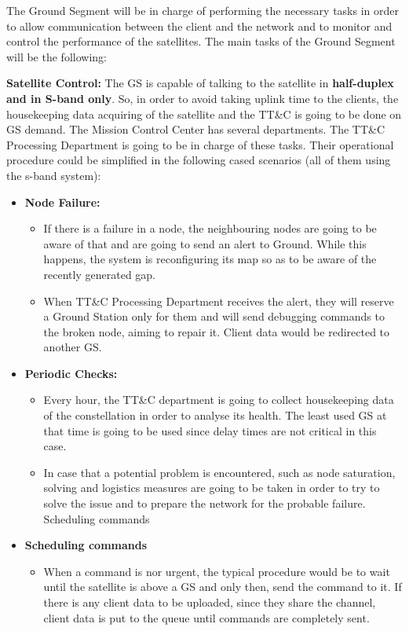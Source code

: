 The Ground Segment will be in charge of performing the necessary tasks in order to allow communication between the client and the network and to monitor and control the performance of the satellites. The main tasks of the Ground Segment will be the following:

\textbf{Satellite Control:} The GS is capable of talking to the satellite in \textbf{half-duplex and in S-band only}. So, in order to avoid taking uplink time to the clients, the housekeeping data acquiring of the satellite and the TT\&C is going to be done on GS demand. The Mission Control Center has several departments. The TT\&C Processing Department is going to be in charge of these tasks. Their operational procedure could be simplified in the following cased scenarios (all of them using the s-band system):

\begin{itemize}

\item \textbf{Node Failure:}
\begin{itemize}
\item If there is a failure in a node, the neighbouring nodes are going to be aware of that and are going to send an alert to Ground. While this happens, the system is reconfiguring its map so as to be aware of the recently generated gap.
\item When TT\&C Processing Department receives the alert, they will reserve a Ground Station only for them and will send debugging commands to the broken node, aiming to repair it. Client data would be redirected to another GS.
\end{itemize}

\item \textbf{Periodic Checks:}

\begin{itemize}
\item Every hour, the TT\&C department is going to collect housekeeping data of the constellation in order to analyse its health. The least used GS at that time is going to be used since delay times are not critical in this case.
\item In case that a potential problem is encountered, such as node saturation, solving and logistics measures are going to be taken in order to try to solve the issue and to prepare the network for the probable failure.
Scheduling commands
\end{itemize}

\item \textbf{Scheduling commands}

\begin{itemize}
\item When a command is nor urgent, the typical procedure would be to wait until the satellite is above a GS and only then, send the command to it. If there is any client data to be uploaded, since they share the channel, client data is put to the queue until commands are completely sent.
\end{itemize}

\end{itemize}

